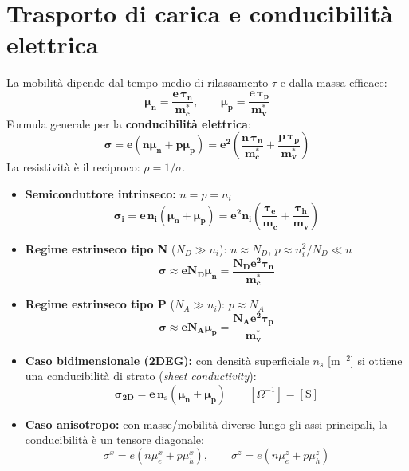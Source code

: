 \newpage

\section{Trasporto di carica e conducibilità elettrica}
La mobilità dipende dal tempo medio di rilassamento $\tau$ e dalla massa efficace:
\[ \bm{\mu_n = \frac{e\,\tau_n}{m_c^*}}, \qquad \bm{\mu_p = \frac{e\,\tau_p}{m_v^*}} \]
Formula generale per la \textbf{conducibilità elettrica}:
\[ \bm{\sigma = e\left(n\mu_n + p\mu_p\right) = e^2\left(\frac{n\,\tau_n}{m_c^*} + \frac{p\,\tau_p}{m_v^*}\right)} \]
La resistività è il reciproco: $\rho = 1/\sigma$.
\begin{itemize}
    \item \textbf{Semiconduttore intrinseco:} $n=p=n_i$
    \[ \bm{\sigma_i = e\,n_i(\mu_n+\mu_p) = e^2 n_i\left(\frac{\tau_e}{m_c}+\frac{\tau_h}{m_v}\right)} \]
    \item \textbf{Regime estrinseco tipo N} ($N_D\gg n_i$): $n\approx N_D$, $p\approx n_i^2/N_D\ll n$
    \[ \bm{\sigma \approx e N_D\mu_n = \frac{N_De^2\tau_n}{m_c^*}} \]
    \item \textbf{Regime estrinseco tipo P} ($N_A\gg n_i$): $p\approx N_A$
    \[ \bm{\sigma \approx e N_A\mu_p = \frac{N_Ae^2\tau_p}{m_v^*}} \]
    \item \textbf{Caso bidimensionale (2DEG):} con densità superficiale $n_s$ [m$^{-2}$] si ottiene una conducibilità di strato (\textit{sheet conductivity}):
    \[ \bm{\sigma_{2D} = e\,n_s(\mu_n+\mu_p)} \qquad [\Omega^{-1}] = [\text{S}] \]
    \item \textbf{Caso anisotropo:} con masse/mobilità diverse lungo gli assi principali, la conducibilità è un tensore diagonale:
    \[ \sigma^x = e\left(n\mu_e^x + p\mu_h^x\right), \qquad \sigma^z = e\left(n\mu_e^z+p\mu_h^z\right) \]
\end{itemize}


